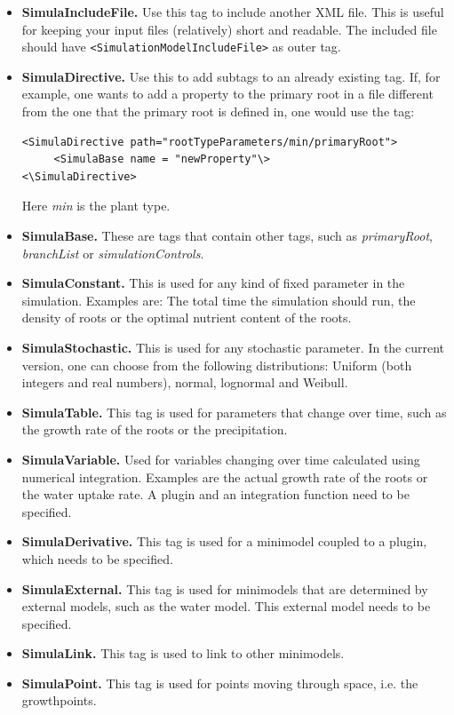 \documentclass{article}
\begin{document}
\begin{itemize}
\item \textbf{SimulaIncludeFile.} Use this tag to include another XML file. This is useful for keeping your input files (relatively) short and readable. The included file should have \verb|<SimulationModelIncludeFile>| as outer tag.
\item \textbf{SimulaDirective.} Use this to add subtags to an already existing tag. If, for example, one wants to add a property to the primary root in a file different from the one that the primary root is defined in, one would use the tag: 
\begin{verbatim}
<SimulaDirective path="rootTypeParameters/min/primaryRoot">
     <SimulaBase name = "newProperty"\>
<\SimulaDirective>
\end{verbatim}
Here \textit{min} is the plant type.
\item \textbf{SimulaBase.} These are tags that contain other tags, such as \textit{primaryRoot}, \textit{branchList} or \textit{simulationControls}.
\item \textbf{SimulaConstant.} This is used for any kind of fixed parameter in the simulation. Examples are: The total time the simulation should run, the density of roots or the optimal nutrient content of the roots.
\item \textbf{SimulaStochastic.} This is used for any stochastic parameter. In the current version, one can choose from the following distributions: Uniform (both integers and real numbers), normal, lognormal and Weibull.
\item \textbf{SimulaTable.} This tag is used for parameters that change over time, such as the growth rate of the roots or the precipitation.
\item \textbf{SimulaVariable.} Used for variables changing over time calculated using numerical integration. Examples are the actual growth rate of the roots or the water uptake rate. A plugin and an integration function need to be specified.
\item \textbf{SimulaDerivative.} This tag is used for a minimodel coupled to a plugin, which needs to be specified.
\item \textbf{SimulaExternal.} This tag is used for minimodels that are determined by external models, such as the water model. This external model needs to be specified.
\item \textbf{SimulaLink.} This tag is used to link to other minimodels.
\item \textbf{SimulaPoint.} This tag is used for points moving through space, i.e. the growthpoints.
\end{itemize}
\end{document}
